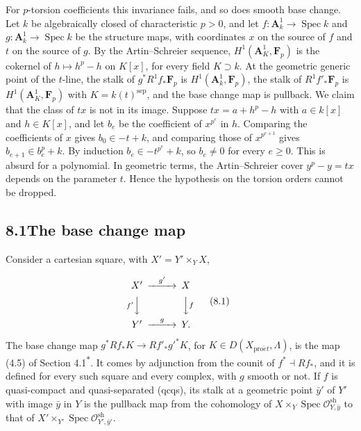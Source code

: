 \documentclass[11pt]{article}
\newcommand{\bpout}[1]{#1\textsuperscript{\hyperlink{bp-outside}{\ensuremath{\ast}}}}
\begin{document}
For \(p\)-torsion coefficients this invariance fails, and so does smooth base change. Let \(k\) be algebraically closed of characteristic \(p>0\), and let \(f:\mathbf A^1_k\to\operatorname{Spec}k\) and \(g:\mathbf A^1_k\to\operatorname{Spec}k\) be the structure maps, with coordinates \(x\) on the source of \(f\) and \(t\) on the source of \(g\). By the Artin–Schreier sequence, \(H^1(\mathbf A^1_K,\mathbf F_p)\) is the cokernel of \(h\mapsto h^p-h\) on \(K[x]\), for every field \(K\supset k\). At the geometric generic point of the \(t\)-line, the stalk of \(g^*R^1f_*\mathbf F_p\) is \(H^1(\mathbf A^1_k,\mathbf F_p)\), the stalk of \(R^1f'_*\mathbf F_p\) is \(H^1(\mathbf A^1_K,\mathbf F_p)\) with \(K=k(t)^{\mathrm{sep}}\), and the base change map is pullback. We claim that the class of \(tx\) is not in its image. Suppose \(tx=a+h^p-h\) with \(a\in k[x]\) and \(h\in K[x]\), and let \(b_e\) be the coefficient of \(x^{p^e}\) in \(h\). Comparing the coefficients of \(x\) gives \(b_0\in -t+k\), and comparing those of \(x^{p^{e+1}}\) gives \(b_{e+1}\in b_e^p+k\). By induction \(b_e\in -t^{p^e}+k\), so \(b_e\neq0\) for every \(e\geq0\). This is absurd for a polynomial. In geometric terms, the Artin–Schreier cover \(y^p-y=tx\) depends on the parameter \(t\). Hence the hypothesis on the torsion orders cannot be dropped.

\subsection*{\texorpdfstring{8.1\quad The base change map}{8.1 The base change map}}
\label{bp3}%
\label{bp4}%
Consider a cartesian square, with \(X'=Y'\times_YX\),

\[
\begin{CD}
X' @>{g'}>> X\\
@V{f'}VV @VV{f}V\\
Y' @>{g}>> Y.
\end{CD}
\tag{8.1}
\]

The base change map \(g^*Rf_*K\to Rf'_*g'^*K\), for \(K\in D(X_{\mathrm{pro}\acute{e}t},\Lambda)\), is the map (4.5) of Section \bpout{4.1}. It comes by adjunction from the counit of \(f^*\dashv Rf_*\), and it is defined for every such square and every complex, with \(g\) smooth or not. If \(f\) is quasi-compact and quasi-separated (qcqs), its stalk at a geometric point \(\bar y'\) of \(Y'\) with image \(\bar y\) in \(Y\) is the pullback map from the cohomology of \(X\times_Y\operatorname{Spec}\mathcal O^{\mathrm{sh}}_{Y,\bar y}\) to that of \(X'\times_{Y'}\operatorname{Spec}\mathcal O^{\mathrm{sh}}_{Y',\bar y'}\).
\end{document}
